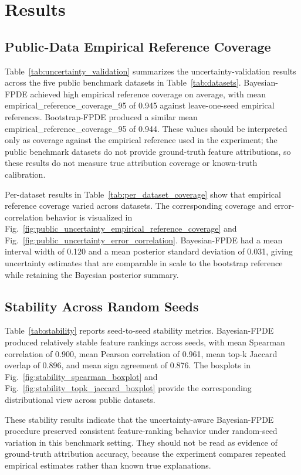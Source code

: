 \section{Results}

\subsection{Public-Data Empirical Reference Coverage}

Table~\ref{tab:uncertainty_validation} summarizes the uncertainty-validation results across the five public benchmark datasets in Table~\ref{tab:datasets}. Bayesian-FPDE achieved high empirical reference coverage on average, with mean empirical\_reference\_coverage\_95 of 0.945 against leave-one-seed empirical references. Bootstrap-FPDE produced a similar mean empirical\_reference\_coverage\_95 of 0.944. These values should be interpreted only as coverage against the empirical reference used in the experiment; the public benchmark datasets do not provide ground-truth feature attributions, so these results do not measure true attribution coverage or known-truth calibration.

Per-dataset results in Table~\ref{tab:per_dataset_coverage} show that empirical reference coverage varied across datasets. The corresponding coverage and error-correlation behavior is visualized in Fig.~\ref{fig:public_uncertainty_empirical_reference_coverage} and Fig.~\ref{fig:public_uncertainty_error_correlation}. Bayesian-FPDE had a mean interval width of 0.120 and a mean posterior standard deviation of 0.031, giving uncertainty estimates that are comparable in scale to the bootstrap reference while retaining the Bayesian posterior summary.

\subsection{Stability Across Random Seeds}

Table~\ref{tab:stability} reports seed-to-seed stability metrics. Bayesian-FPDE produced relatively stable feature rankings across seeds, with mean Spearman correlation of 0.900, mean Pearson correlation of 0.961, mean top-k Jaccard overlap of 0.896, and mean sign agreement of 0.876. The boxplots in Fig.~\ref{fig:stability_spearman_boxplot} and Fig.~\ref{fig:stability_topk_jaccard_boxplot} provide the corresponding distributional view across public datasets.

These stability results indicate that the uncertainty-aware Bayesian-FPDE procedure preserved consistent feature-ranking behavior under random-seed variation in this benchmark setting. They should not be read as evidence of ground-truth attribution accuracy, because the experiment compares repeated empirical estimates rather than known true explanations.

